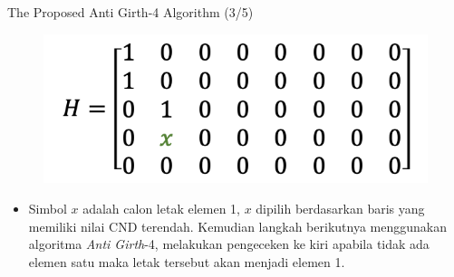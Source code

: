 \documentclass[11pt, aspectratio=169]{beamer}
\begin{document}
\begin{frame}{The Proposed Anti Girth-4 Algorithm (3/5)}
	\centering 
	\begin{figure}
		\centering 
		\includegraphics[scale=0.75]{gambarafa/step4}
		\centering 
	\end{figure}
	\begin{itemize}
		\item[4.] Simbol $x$ adalah calon letak elemen 1, $x$ dipilih berdasarkan baris yang memiliki nilai CND terendah. Kemudian langkah berikutnya menggunakan algoritma \textit{Anti Girth}-4, melakukan pengeceken ke kiri apabila tidak ada elemen satu maka letak tersebut akan menjadi elemen 1.
	\end{itemize}
	
	
	
	
\end{frame}
\end{document}
